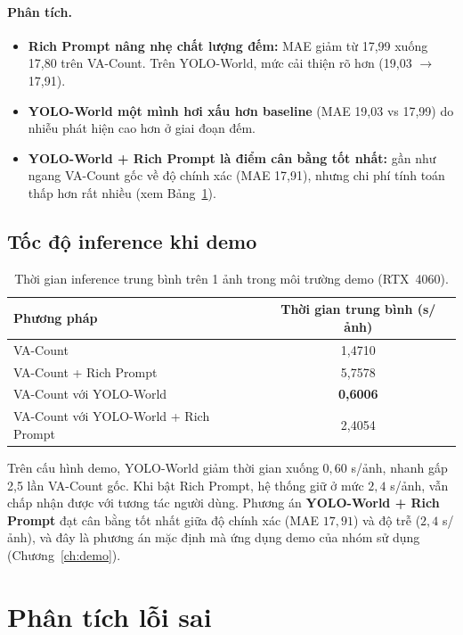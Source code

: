 \documentclass[a4paper,12pt]{report}
\numberwithin{figure}{chapter}
\numberwithin{table}{chapter}
\begin{document}
\paragraph{Phân tích.}
\begin{itemize}
    \item \textbf{Rich Prompt nâng nhẹ chất lượng đếm:} MAE giảm từ 17,99 xuống 17,80 trên VA-Count. Trên YOLO-World, mức cải thiện rõ hơn (19,03 $\to$ 17,91).
    \item \textbf{YOLO-World một mình hơi xấu hơn baseline} (MAE 19,03 vs 17,99) do nhiễu phát hiện cao hơn ở giai đoạn đếm.
    \item \textbf{YOLO-World + Rich Prompt là điểm cân bằng tốt nhất:} gần như ngang VA-Count gốc về độ chính xác (MAE 17,91), nhưng chi phí tính toán thấp hơn rất nhiều (xem Bảng~\ref{tab:demo_time}).
\end{itemize}

\subsection{Tốc độ inference khi demo}

\begin{table}[H]
\centering
\renewcommand{\arraystretch}{1.2}
\begin{tabular}{|l|c|}
\hline
\rowcolor[HTML]{EFEFEF}
\textbf{Phương pháp} & \textbf{Thời gian trung bình (s/ảnh)} \\
\hline
VA-Count & 1,4710 \\
\hline
VA-Count + Rich Prompt & 5,7578 \\
\hline
VA-Count với YOLO-World & \textbf{0,6006} \\
\hline
VA-Count với YOLO-World + Rich Prompt & 2,4054 \\
\hline
\end{tabular}
\caption{Thời gian inference trung bình trên 1 ảnh trong môi trường demo (RTX~4060).}
\label{tab:demo_time}
\end{table}

Trên cấu hình demo, YOLO-World giảm thời gian xuống $0{,}60$ s/ảnh, nhanh gấp 2,5 lần VA-Count gốc. Khi bật Rich Prompt, hệ thống giữ ở mức $2{,}4$ s/ảnh, vẫn chấp nhận được với tương tác người dùng. Phương án \textbf{YOLO-World + Rich Prompt} đạt cân bằng tốt nhất giữa độ chính xác (MAE $17{,}91$) và độ trễ ($2{,}4$ s/ảnh), và đây là phương án mặc định mà ứng dụng demo của nhóm sử dụng (Chương~\ref{ch:demo}).

\section{Phân tích lỗi sai}
\label{sec:error-analysis}
\end{document}
